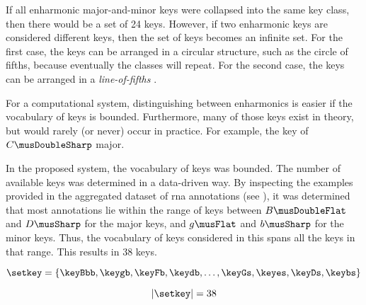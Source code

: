 
If all enharmonic major-and-minor keys were collapsed into
the same key class, then there would be a set of 24 keys.
However, if two enharmonic keys are considered different
keys, then the set of keys becomes an infinite set. For the
first case, the keys can be arranged in a circular
structure, such as the circle of fifths, because eventually
the classes will repeat. For the second case, the keys can
be arranged in a \emph{line-of-fifths}
\parencite{temperley2000line}.

For a computational system, distinguishing between
enharmonics is easier if the vocabulary of keys is bounded.
Furthermore, many of those keys exist in theory, but would
rarely (or never) occur in practice. For example, the key of
$C\musDoubleSharp$ major.

In the proposed system, the vocabulary of keys was bounded.
The number of available keys was determined in a data-driven
way. By inspecting the examples provided in the aggregated
dataset of \gls{rna} annotations (see
), it was determined
that most annotations lie within the range of keys between
$B\musDoubleFlat$ and $D\musSharp$ for the major keys, and
$g\musFlat$ and $b\musSharp$ for the minor keys. Thus, the
vocabulary of keys considered in this \thesisdiss{} spans
all the keys in that range. This results in 38 keys.

\begin{equation}
    \setkey = \{ \keyBbb, \keygb, \keyFb, \keydb, \dotsc,
    \keyGs, \keyes, \keyDs, \keybs \}
\end{equation}

\begin{equation}
    | \setkey | = 38
\end{equation}
